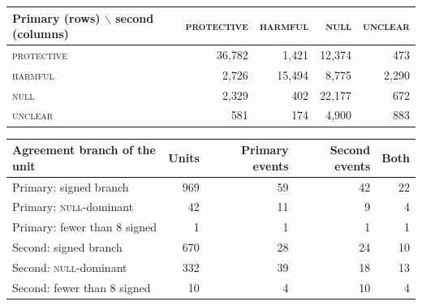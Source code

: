 \documentclass[11pt]{article}
\begin{document}
\begin{table}[!t]\centering\scriptsize
\setlength{\tabcolsep}{4pt}
\begin{tabular}{@{}lrrrr@{}}
\toprule
Primary (rows) $\backslash$ second (columns) & \textsc{protective} & \textsc{harmful} & \textsc{null} & \textsc{unclear} \\
\midrule
\textsc{protective} & 36{,}782 & 1{,}421 & 12{,}374 & 473 \\
\textsc{harmful} & 2{,}726 & 15{,}494 & 8{,}775 & 2{,}290 \\
\textsc{null} & 2{,}329 & 402 & 22{,}177 & 672 \\
\textsc{unclear} & 581 & 174 & 4{,}900 & 883 \\
\bottomrule
\end{tabular}
\hspace{4mm}
\begin{tabular}{@{}lrrrr@{}}
\toprule
Agreement branch of the unit & Units & Primary events & Second events & Both \\
\midrule
Primary: signed branch & 969 & 59 & 42 & 22 \\
Primary: \textsc{null}-dominant & 42 & 11 & 9 & 4 \\
Primary: fewer than 8 signed & 1 & 1 & 1 & 1 \\
Second: signed branch & 670 & 28 & 24 & 10 \\
Second: \textsc{null}-dominant & 332 & 39 & 18 & 13 \\
Second: fewer than 8 signed & 10 & 4 & 10 & 4 \\
\bottomrule
\end{tabular}
\vspace{4pt}


\end{table}
\end{document}
